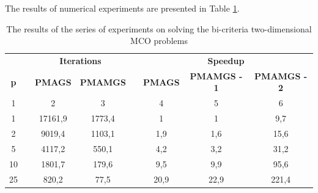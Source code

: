 \documentclass[procedia]{easychair}
\begin{document}
The results of numerical experiments are presented in Table \ref{tab:02}.

\begin{table}[t]
\centering
\caption{The results of the series of experiments on solving the bi-criteria two-dimensional MCO problems}
\label{tab:02}
\begin{tabular}{cccccccc}
\hline
\multicolumn{1}{c}{\textbf{}}  &  & \multicolumn{2}{c}{\textbf{Iterations}}                                  &  & \multicolumn{3}{c}{\textbf{Speedup}}                                                                                   \\ \cline{3-4} \cline{6-8} 
\multicolumn{1}{c}{\textbf{p}} &  & \multicolumn{1}{c}{\textbf{PMAGS}} & \multicolumn{1}{c}{\textbf{PMAMGS}} &  & \multicolumn{1}{c}{\textbf{PMAGS}} & \multicolumn{1}{c}{\textbf{PMAMGS - 1}} & \multicolumn{1}{c}{\textbf{PMAMGS - 2}} \\ \cline{1-1} \cline{3-4} \cline{6-8}
1                              &  & 2                                  & 3                                   &  & 4                                  & 5                                       & 6                                       \\ \cline{1-1} \cline{3-4} \cline{6-8}
1                              &  & 17161,9                            & 1773,4                              &  & 1                                  & 1                                       & 9,7                                     \\
2                              &  & 9019,4                             & 1103,1                              &  & 1,9                                & 1,6                                     & 15,6                                    \\
5                              &  & 4117,2                             & 550,1                               &  & 4,2                                & 3,2                                     & 31,2                                    \\
10                             &  & 1801,7                             & 179,6                               &  & 9,5                                & 9,9                                     & 95,6                                    \\
25                             &  & 820,2                              & 77,5                                &  & 20,9                               & 22,9                                    & 221,4                                   \\ \hline
\end{tabular}
\end{table}
\end{document}
